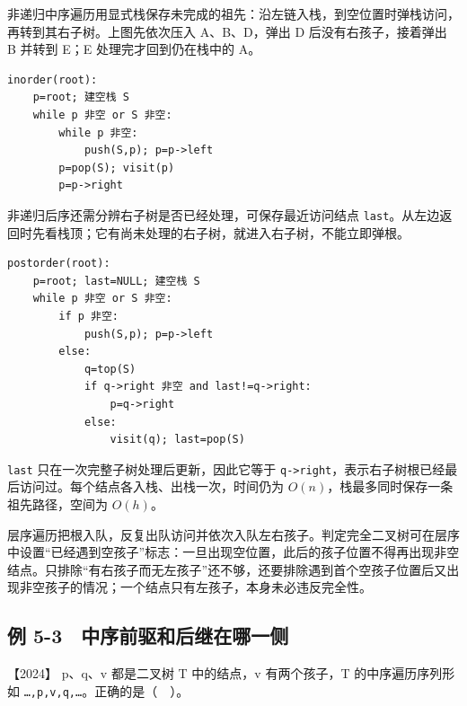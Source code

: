 非递归中序遍历用显式栈保存未完成的祖先：沿左链入栈，到空位置时弹栈访问，再转到其右子树。上图先依次压入 A、B、D，弹出 D 后没有右孩子，接着弹出 B 并转到 E；E 处理完才回到仍在栈中的 A。

\par\medskip\noindent
\begin{minipage}{\linewidth}
\begin{verbatim}
inorder(root):
    p=root; 建空栈 S
    while p 非空 or S 非空:
        while p 非空:
            push(S,p); p=p->left
        p=pop(S); visit(p)
        p=p->right
\end{verbatim}
\end{minipage}\par\medskip

非递归后序还需分辨右子树是否已经处理，可保存最近访问结点 \allowbreak{}\texttt{last}。从左边返回时先看栈顶；它有尚未处理的右子树，就进入右子树，不能立即弹根。

\par\medskip\noindent
\begin{minipage}{\linewidth}
\begin{verbatim}
postorder(root):
    p=root; last=NULL; 建空栈 S
    while p 非空 or S 非空:
        if p 非空:
            push(S,p); p=p->left
        else:
            q=top(S)
            if q->right 非空 and last!=q->right:
                p=q->right
            else:
                visit(q); last=pop(S)
\end{verbatim}
\end{minipage}\par\medskip

\allowbreak{}\texttt{last} 只在一次完整子树处理后更新，因此它等于 \allowbreak{}\texttt{q-\textgreater{}right}，表示右子树根已经最后访问过。每个结点各入栈、出栈一次，时间仍为 \(O(n)\)，栈最多同时保存一条祖先路径，空间为 \(O(h)\)。

层序遍历把根入队，反复出队访问并依次入队左右孩子。判定完全二叉树可在层序中设置``已经遇到空孩子''标志：一旦出现空位置，此后的孩子位置不得再出现非空结点。只排除``有右孩子而无左孩子''还不够，还要排除遇到首个空孩子位置后又出现非空孩子的情况；一个结点只有左孩子，本身未必违反完全性。

\subsection{例 5-3　中序前驱和后继在哪一侧}\label{ds-ex5-3}

\noindent{}【2024】 p、q、v 都是二叉树 T 中的结点，v 有两个孩子，T 的中序遍历序列形如 \allowbreak{}\texttt{…,}\allowbreak{}\texttt{p,}\allowbreak{}\texttt{v,}\allowbreak{}\texttt{q,}\allowbreak{}\texttt{…}。正确的是（　）。

